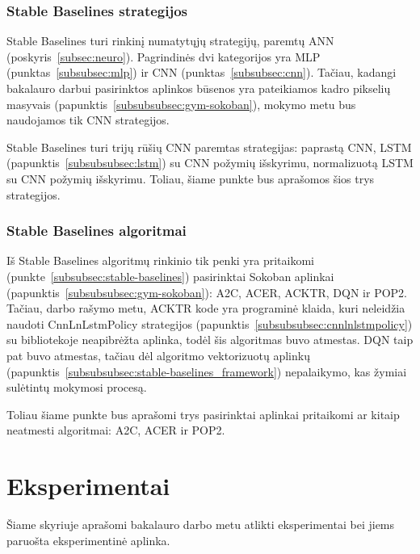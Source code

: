 \documentclass{VUMIFPSbakalaurinis}
\begin{document}
\subsubsection{Stable Baselines strategijos}
{
	Stable Baselines turi rinkinį numatytųjų strategijų, paremtų ANN (poskyris~\ref{subsec:neuro}). Pagrindinės dvi kategorijos yra MLP (punktas~\ref{subsubsec:mlp}) ir CNN (punktas~\ref{subsubsec:cnn}). Tačiau, kadangi bakalauro darbui pasirinktos aplinkos būsenos yra pateikiamos kadro pikselių masyvais (papunktis~\ref{subsubsubsec:gym-sokoban}), mokymo metu bus naudojamos tik CNN strategijos.\par
	
	Stable Baselines turi trijų rūšių CNN paremtas strategijas: paprastą CNN, LSTM (papunktis~\ref{subsubsubsec:lstm}) su CNN požymių išskyrimu, normalizuotą LSTM su CNN požymių išskyrimu. Toliau, šiame punkte bus aprašomos šios trys strategijos.
}
\label{subsubsubsec:cnnpolicy}
\label{subsubsubsec:cnnlstmpolicy}
\label{subsubsubsec:cnnlnlstmpolicy}
\subsubsection{Stable Baselines algoritmai}
{
	Iš Stable Baselines algoritmų rinkinio tik penki yra pritaikomi (punkte~\ref{subsubsec:stable-baselines}) pasirinktai Sokoban aplinkai (papunktis~\ref{subsubsubsec:gym-sokoban}): A2C, ACER, ACKTR, DQN ir POP2. Tačiau, darbo rašymo metu, ACKTR kode yra programinė klaida, kuri  neleidžia naudoti CnnLnLstmPolicy strategijos (papunktis~\ref{subsubsubsec:cnnlnlstmpolicy}) su bibliotekoje neapibrėžta aplinka, todėl šis algoritmas buvo atmestas. DQN taip pat buvo atmestas, tačiau dėl algoritmo vektorizuotų aplinkų (papunktis~\ref{subsubsubsec:stable-baselines_framework}) nepalaikymo, kas žymiai sulėtintų mokymosi procesą.\par
	
	Toliau šiame punkte bus aprašomi trys pasirinktai aplinkai pritaikomi ar kitaip neatmesti algoritmai: A2C, ACER ir POP2.
}
\section{Eksperimentai}
{
	Šiame skyriuje aprašomi bakalauro darbo metu atlikti eksperimentai bei jiems paruošta eksperimentinė aplinka.
}
\end{document}
